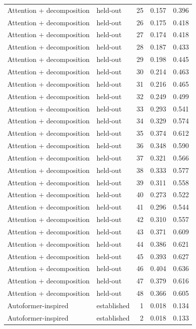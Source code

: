 \begin{tabular}{llrrr}
Attention + decomposition & held-out & 25 & 0.157 & 0.396 \\
Attention + decomposition & held-out & 26 & 0.175 & 0.418 \\
Attention + decomposition & held-out & 27 & 0.174 & 0.418 \\
Attention + decomposition & held-out & 28 & 0.187 & 0.433 \\
Attention + decomposition & held-out & 29 & 0.198 & 0.445 \\
Attention + decomposition & held-out & 30 & 0.214 & 0.463 \\
Attention + decomposition & held-out & 31 & 0.216 & 0.465 \\
Attention + decomposition & held-out & 32 & 0.249 & 0.499 \\
Attention + decomposition & held-out & 33 & 0.293 & 0.541 \\
Attention + decomposition & held-out & 34 & 0.329 & 0.574 \\
Attention + decomposition & held-out & 35 & 0.374 & 0.612 \\
Attention + decomposition & held-out & 36 & 0.348 & 0.590 \\
Attention + decomposition & held-out & 37 & 0.321 & 0.566 \\
Attention + decomposition & held-out & 38 & 0.333 & 0.577 \\
Attention + decomposition & held-out & 39 & 0.311 & 0.558 \\
Attention + decomposition & held-out & 40 & 0.273 & 0.522 \\
Attention + decomposition & held-out & 41 & 0.296 & 0.544 \\
Attention + decomposition & held-out & 42 & 0.310 & 0.557 \\
Attention + decomposition & held-out & 43 & 0.371 & 0.609 \\
Attention + decomposition & held-out & 44 & 0.386 & 0.621 \\
Attention + decomposition & held-out & 45 & 0.393 & 0.627 \\
Attention + decomposition & held-out & 46 & 0.404 & 0.636 \\
Attention + decomposition & held-out & 47 & 0.379 & 0.616 \\
Attention + decomposition & held-out & 48 & 0.366 & 0.605 \\
Autoformer-inspired & established & 1 & 0.018 & 0.134 \\
Autoformer-inspired & established & 2 & 0.018 & 0.133 \\

\end{tabular}
